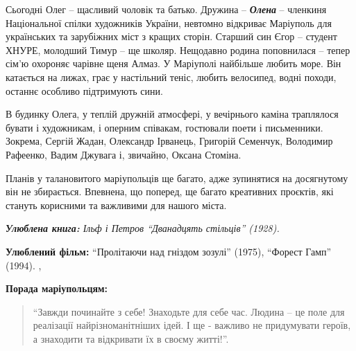 Сьогодні Олег – щасливий чоловік та батько. Дружина – \emph{\textbf{Олена}} – членкиня
Національної спілки художників України, невтомно відкриває Маріуполь для
українських та зарубіжних міст з кращих сторін. Старший син Єгор – студент
ХНУРЕ, молодший Тимур –  ще школяр. Нещодавно родина поповнилася – тепер сім'ю
охороняє чарівне щеня Алмаз. У Маріуполі найбільше любить море. Він катається
на лижах, грає у настільний теніс, любить велосипед, водні походи, останнє
особливо підтримують сини.

В будинку Олега, у теплій дружній атмосфері, у вечірнього каміна траплялося
бувати і художникам, і оперним співакам, гостювали поети і письменники.
Зокрема, Сергій Жадан, Олександр Ірванець, Григорій Семенчук, Володимир
Рафеенко, Вадим Джувага і, звичайно, Оксана Стоміна.


Планів у талановитого маріупольців ще багато, адже зупинятися на досягнутому
він не збирається. Впевнена, що поперед, ще багато креативних проєктів, які
стануть корисними та важливими для нашого міста.

\begingroup
\em
\textbf{Улюблена книга:} Ільф і Петров  \enquote{Дванадцять стільців} (1928).

\textbf{Улюблений фільм:}  \enquote{Пролітаючи над гніздом зозулі} (1975), \enquote{Форест Гамп} (1994). ,

\textbf{Порада маріупольцям:}  

\begin{quote}
\enquote{Завжди починайте з себе! Знаходьте для себе час. Людина – це поле для реалізації найрізноманітніших ідей. І ще -  важливо не придумувати героїв, а знаходити та відкривати їх в своєму житті!}.
\end{quote}
\endgroup
